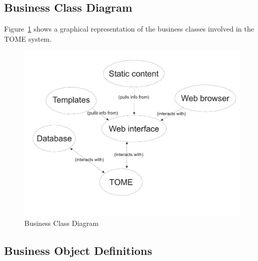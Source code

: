 \documentclass[12pt,titlepage]{article}
\begin{document}
\subsection{Business Class Diagram}
Figure~\ref{BusinessModelDiagram} shows a graphical representation of the business classes involved in the TOME system.
\begin{figure}[h]
	\includegraphics[width=\textwidth]{BusinessModelDiagram}
	\caption{Business Class Diagram}
	\label{BusinessModelDiagram}
\end{figure}
\subsection{Business Object Definitions}
\end{document}
